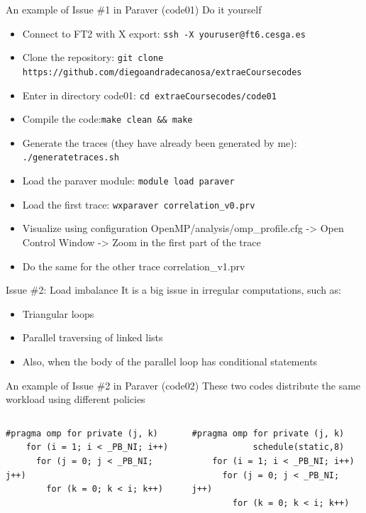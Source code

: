 \documentclass[10pt,xcolor=table]{beamer}
\begin{document}
\begin{frame}{An example of Issue \#1 in Paraver (code01)}
Do it yourself
\begin{itemize}
    \item Connect to FT2 with X export: {\tt ssh -X youruser@ft6.cesga.es}
    \item Clone the repository: {\tt git clone https://github.com/diegoandradecanosa/extraeCoursecodes}
    \item Enter in directory code01: {\tt cd extraeCoursecodes/code01}
    \item Compile the code:{\tt make clean && make}
    \item Generate the traces (they have already been generated by me): {\tt ./generatetraces.sh}
    \item Load the paraver module:  {\tt module load paraver}
    \item Load the first trace: {\tt wxparaver correlation\_v0.prv}
    \item Visualize using configuration OpenMP/analysis/omp\_profile.cfg -> Open Control Window -> Zoom in the first part of the trace
    \item Do the same for the other trace correlation\_v1.prv
\end{itemize}
\end{frame}

\begin{frame}{Issue \#2: Load imbalance}
It is a big issue in irregular computations, such as:
\begin{itemize}
    \item Triangular loops
    \item Parallel traversing of linked lists
    \item Also, when the body of the parallel loop has conditional statements
\end{itemize}
\end{frame}

\begin{frame}[fragile]{An example of Issue \#2 in Paraver (code02)}
These two codes distribute the same workload using different policies
\begin{columns}
\begin{column}{0.5\textwidth}
\begin{lstlisting}[style=shell,basicstyle=\scriptsize\ttfamily,gobble=3,caption={Default scheduling}]
    #pragma omp for private (j, k)
    for (i = 1; i < _PB_NI; i++)
      for (j = 0; j < _PB_NI; j++)
        for (k = 0; k < i; k++)
  \end{lstlisting}
  \end{column}
\begin{column}{0.5\textwidth}
  \begin{lstlisting}[style=shell,gobble=3,basicstyle=\scriptsize\ttfamily,caption={Load-balance-aware scheduling}]
    #pragma omp for private (j, k) 
            schedule(static,8)
    for (i = 1; i < _PB_NI; i++)
      for (j = 0; j < _PB_NI; j++)
	    for (k = 0; k < i; k++)
  \end{lstlisting}
  \end{column}
  \end{columns}
\end{frame}
\end{document}
